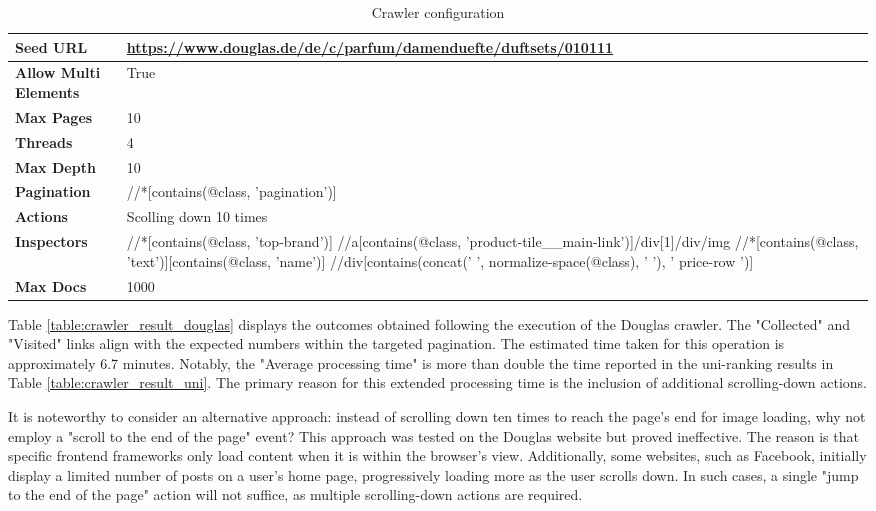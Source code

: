 {\begin{table}[ht] 
{\footnotesize
\begin{tabular}{ P{3cm} ||P{10.1cm}  }      %
 \hline \hline
\textbf{Seed URL} & \href{https://www.douglas.de/de/c/parfum/damenduefte/duftsets/010111}{https://www.douglas.de/de/c/parfum/damenduefte/duftsets/010111}\T\B 
\\ 
\hline
\textbf{Allow Multi Elements} & True \T\B 
\\ 
\hline
\textbf{Max Pages} & 10\T\B 
\\ 
\hline
\textbf{Threads} & 4\T\B 
\\ 
\hline
\textbf{Max Depth} & 10\T\B 
\\ 
\hline
\textbf{Pagination} & //*[contains(@class, 'pagination')]\T\B 
\\ 
\hline
\textbf{Actions} & Scolling down 10 times\T\B 
\\ 
\hline
\textbf{Inspectors} & //*[contains(@class, 'top-brand')]\T\B  \newline
//a[contains(@class, 'product-tile\_\_main-link')]/div[1]/div/img \newline
//*[contains(@class, 'text')][contains(@class, 'name')] \newline
//div[contains(concat(' ', normalize-space(@class), ' '), ' price-row ')]\B  
\\ 
\hline
\textbf{Max Docs} & 1000\T\B 
\\ 
\hline \hline
    \end{tabular}
}
  \captionsetup{justification=centering,margin=2cm}
  \caption{Crawler configuration}
  \label{table:crawler_conf_douglas}
\end{table}

Table \ref{table:crawler_result_douglas} displays the outcomes obtained following the execution of the Douglas crawler. The "Collected" and "Visited" links align with the expected numbers within the targeted pagination. The estimated time taken for this operation is approximately 6.7 minutes. Notably, the "Average processing time" is more than double the time reported in the uni-ranking results in Table \ref{table:crawler_result_uni}. The primary reason for this extended processing time is the inclusion of additional scrolling-down actions.

It is noteworthy to consider an alternative approach: instead of scrolling down ten times to reach the page's end for image loading, why not employ a "scroll to the end of the page" event? This approach was tested on the Douglas website but proved ineffective. The reason is that specific frontend frameworks only load content when it is within the browser's view. Additionally, some websites, such as Facebook, initially display a limited number of posts on a user's home page, progressively loading more as the user scrolls down. In such cases, a single "jump to the end of the page" action will not suffice, as multiple scrolling-down actions are required.

}
